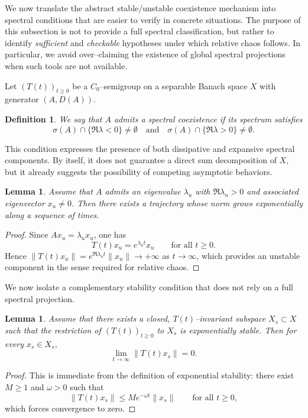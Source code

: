 \documentclass[12pt]{article}
\newtheorem{lemma}[theorem]{Lemma}
\newtheorem{definition}[theorem]{Definition}
\begin{document}
We now translate the abstract stable/unstable coexistence mechanism into spectral conditions that are easier to verify in concrete situations. The purpose of this subsection is not to provide a full spectral classification, but rather to identify \emph{sufficient} and \emph{checkable} hypotheses under which relative chaos follows.
In particular, we avoid over--claiming the existence of global spectral projections when such tools are not available.

Let $(T(t))_{t\ge 0}$ be a $C_0$--semigroup on a separable Banach space $X$ with generator $(A,D(A))$.

\begin{definition}
We say that $A$ admits a \emph{spectral coexistence} if its spectrum satisfies
\[
\sigma(A)\cap\{\Re \lambda<0\}\neq\emptyset
\quad\text{and}\quad
\sigma(A)\cap\{\Re \lambda>0\}\neq\emptyset .
\]
\end{definition}

This condition expresses the presence of both dissipative and expansive spectral components. By itself, it does not guarantee a direct sum decomposition of $X$, but it already suggests the possibility of competing asymptotic behaviors.

\begin{lemma}\label{lem:unstable_eigen}
Assume that $A$ admits an eigenvalue $\lambda_u$ with $\Re\lambda_u>0$ and associated eigenvector $x_u\neq 0$. Then there exists a trajectory whose norm grows exponentially along a sequence of times.
\end{lemma}

\begin{proof}
Since $Ax_u=\lambda_u x_u$, one has
\[
T(t)x_u = e^{\lambda_u t}x_u \qquad \text{for all } t\ge 0.
\]
Hence $\|T(t)x_u\|=e^{\Re\lambda_u t}\|x_u\|\to +\infty$ as $t\to\infty$, which provides an unstable component in the sense required for relative chaos.
\end{proof}

We now isolate a complementary stability condition that does not rely on a full spectral projection.

\begin{lemma}\label{lem:stable_part}
Assume that there exists a closed, $T(t)$--invariant subspace $X_s\subset X$ such that the restriction of $(T(t))_{t\ge 0}$ to $X_s$ is exponentially stable. Then for every $x_s\in X_s$,
\[
\lim_{t\to\infty}\|T(t)x_s\|=0 .
\]
\end{lemma}

\begin{proof}
This is immediate from the definition of exponential stability: there exist $M\ge 1$ and $\omega>0$ such that
\[
\|T(t)x_s\|\le M e^{-\omega t}\|x_s\| \qquad \text{for all } t\ge 0,
\]
which forces convergence to zero.
\end{proof}
\end{document}
